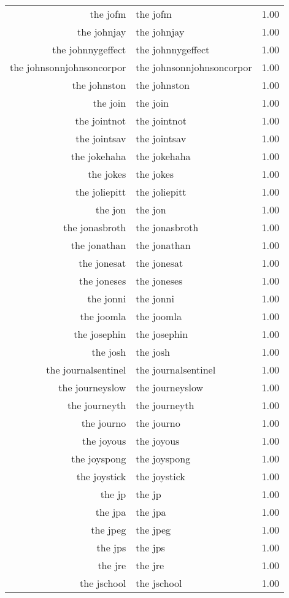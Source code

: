 \begin{table}[ht]
\begin{tabular}{rlr}
  the jofm & the jofm & 1.00 \\ 
  the johnjay & the johnjay & 1.00 \\ 
  the johnnygeffect & the johnnygeffect & 1.00 \\ 
  the johnsonnjohnsoncorpor & the johnsonnjohnsoncorpor & 1.00 \\ 
  the johnston & the johnston & 1.00 \\ 
  the join & the join & 1.00 \\ 
  the jointnot & the jointnot & 1.00 \\ 
  the jointsav & the jointsav & 1.00 \\ 
  the jokehaha & the jokehaha & 1.00 \\ 
  the jokes & the jokes & 1.00 \\ 
  the joliepitt & the joliepitt & 1.00 \\ 
  the jon & the jon & 1.00 \\ 
  the jonasbroth & the jonasbroth & 1.00 \\ 
  the jonathan & the jonathan & 1.00 \\ 
  the jonesat & the jonesat & 1.00 \\ 
  the joneses & the joneses & 1.00 \\ 
  the jonni & the jonni & 1.00 \\ 
  the joomla & the joomla & 1.00 \\ 
  the josephin & the josephin & 1.00 \\ 
  the josh & the josh & 1.00 \\ 
  the journalsentinel & the journalsentinel & 1.00 \\ 
  the journeyslow & the journeyslow & 1.00 \\ 
  the journeyth & the journeyth & 1.00 \\ 
  the journo & the journo & 1.00 \\ 
  the joyous & the joyous & 1.00 \\ 
  the joyspong & the joyspong & 1.00 \\ 
  the joystick & the joystick & 1.00 \\ 
  the jp & the jp & 1.00 \\ 
  the jpa & the jpa & 1.00 \\ 
  the jpeg & the jpeg & 1.00 \\ 
  the jps & the jps & 1.00 \\ 
  the jre & the jre & 1.00 \\ 
  the jschool & the jschool & 1.00 \\ 

\end{tabular}
\end{table}
